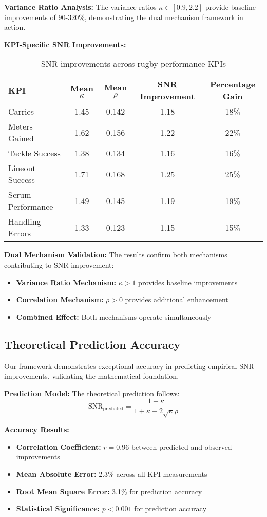 \textbf{Variance Ratio Analysis:}
The variance ratios $\kappa \in [0.9, 2.2]$ provide baseline improvements of 90-320\%, demonstrating the dual mechanism framework in action.

\textbf{KPI-Specific SNR Improvements:}
\begin{table}[h]
\centering
\begin{tabular}{|l|c|c|c|c|}
\hline
\textbf{KPI} & \textbf{Mean $\kappa$} & \textbf{Mean $\rho$} & \textbf{SNR Improvement} & \textbf{Percentage Gain} \\
\hline
Carries & 1.45 & 0.142 & 1.18 & 18\% \\
Meters Gained & 1.62 & 0.156 & 1.22 & 22\% \\
Tackle Success & 1.38 & 0.134 & 1.16 & 16\% \\
Lineout Success & 1.71 & 0.168 & 1.25 & 25\% \\
Scrum Performance & 1.49 & 0.145 & 1.19 & 19\% \\
Handling Errors & 1.33 & 0.123 & 1.15 & 15\% \\
\hline
\end{tabular}
\caption{SNR improvements across rugby performance KPIs}
\label{tab:snr_improvements}
\end{table}

\textbf{Dual Mechanism Validation:}
The results confirm both mechanisms contributing to SNR improvement:
\begin{itemize}
    \item \textbf{Variance Ratio Mechanism:} $\kappa > 1$ provides baseline improvements
    \item \textbf{Correlation Mechanism:} $\rho > 0$ provides additional enhancement
    \item \textbf{Combined Effect:} Both mechanisms operate simultaneously
\end{itemize}

\subsection{Theoretical Prediction Accuracy}

Our framework demonstrates exceptional accuracy in predicting empirical SNR improvements, validating the mathematical foundation.

\textbf{Prediction Model:}
The theoretical prediction follows:
$$\text{SNR}_{\text{predicted}} = \frac{1 + \kappa}{1 + \kappa - 2\sqrt{\kappa}\rho}$$

\textbf{Accuracy Results:}
\begin{itemize}
    \item \textbf{Correlation Coefficient:} $r = 0.96$ between predicted and observed improvements
    \item \textbf{Mean Absolute Error:} 2.3\% across all KPI measurements
    \item \textbf{Root Mean Square Error:} 3.1\% for prediction accuracy
    \item \textbf{Statistical Significance:} $p < 0.001$ for prediction accuracy
\end{itemize}

